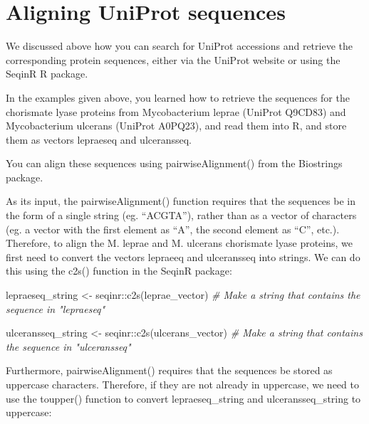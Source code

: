 \documentclass[
]{book}
\newenvironment{Shaded}{\begin{snugshade}}{\end{snugshade}}
\newcommand{\CommentTok}[1]{\textcolor[rgb]{0.56,0.35,0.01}{\textit{#1}}}
\newcommand{\FunctionTok}[1]{\textcolor[rgb]{0.00,0.00,0.00}{#1}}
\newcommand{\NormalTok}[1]{#1}
\newcommand{\OtherTok}[1]{\textcolor[rgb]{0.56,0.35,0.01}{#1}}
\newcommand{\SpecialCharTok}[1]{\textcolor[rgb]{0.00,0.00,0.00}{#1}}
\begin{document}
\hypertarget{aligning-uniprot-sequences}{%
\section{Aligning UniProt sequences}\label{aligning-uniprot-sequences}}

We discussed above how you can search for UniProt accessions and retrieve the corresponding protein sequences, either via the UniProt website or using the SeqinR R package.

In the examples given above, you learned how to retrieve the sequences for the chorismate lyase proteins from Mycobacterium leprae (UniProt Q9CD83) and Mycobacterium ulcerans (UniProt A0PQ23), and read them into R, and store them as vectors lepraeseq and ulceransseq.

You can align these sequences using pairwiseAlignment() from the Biostrings package.

As its input, the pairwiseAlignment() function requires that the sequences be in the form of a single string (eg. ``ACGTA''), rather than as a vector of characters (eg. a vector with the first element as ``A'', the second element as ``C'', etc.). Therefore, to align the M. leprae and M. ulcerans chorismate lyase proteins, we first need to convert the vectors lepraeeq and ulceransseq into strings. We can do this using the c2s() function in the SeqinR package:

\begin{Shaded}
\begin{Highlighting}[]
\NormalTok{lepraeseq\_string }\OtherTok{\textless{}{-}}\NormalTok{ seqinr}\SpecialCharTok{::}\FunctionTok{c2s}\NormalTok{(leprae\_vector)     }\CommentTok{\# Make a string that contains the sequence in "lepraeseq"}
\end{Highlighting}
\end{Shaded}

\begin{Shaded}
\begin{Highlighting}[]
\NormalTok{ulceransseq\_string }\OtherTok{\textless{}{-}}\NormalTok{ seqinr}\SpecialCharTok{::}\FunctionTok{c2s}\NormalTok{(ulcerans\_vector) }\CommentTok{\# Make a string that contains the sequence in "ulceransseq"}
\end{Highlighting}
\end{Shaded}

Furthermore, pairwiseAlignment() requires that the sequences be stored as uppercase characters. Therefore, if they are not already in uppercase, we need to use the toupper() function to convert lepraeseq\_string and ulceransseq\_string to uppercase:
\end{document}
